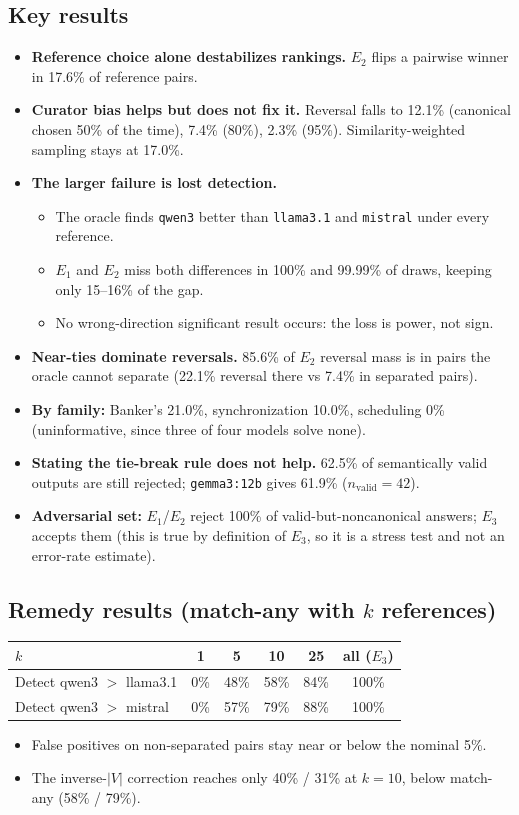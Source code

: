 \documentclass[11pt,a4paper]{article}
\newcommand{\E}[1]{E_{#1}}
\begin{document}
\subsection{Key results}
\begin{itemize}
\item \textbf{Reference choice alone destabilizes rankings.} $\E2$ flips a pairwise winner in 17.6\% of reference pairs.
\item \textbf{Curator bias helps but does not fix it.} Reversal falls to 12.1\% (canonical chosen 50\% of the time), 7.4\% (80\%), 2.3\% (95\%). Similarity-weighted sampling stays at 17.0\%.
\item \textbf{The larger failure is lost detection.}
  \begin{itemize}
  \item The oracle finds \texttt{qwen3} better than \texttt{llama3.1} and \texttt{mistral} under every reference.
  \item $\E1$ and $\E2$ miss both differences in 100\% and 99.99\% of draws, keeping only 15--16\% of the gap.
  \item No wrong-direction significant result occurs: the loss is power, not sign.
  \end{itemize}
\item \textbf{Near-ties dominate reversals.} 85.6\% of $\E2$ reversal mass is in pairs the oracle cannot separate (22.1\% reversal there vs 7.4\% in separated pairs).
\item \textbf{By family:} Banker's 21.0\%, synchronization 10.0\%, scheduling 0\% (uninformative, since three of four models solve none).
\item \textbf{Stating the tie-break rule does not help.} 62.5\% of semantically valid outputs are still rejected; \texttt{gemma3:12b} gives 61.9\% ($n_{\text{valid}}=42$).
\item \textbf{Adversarial set:} $\E1$/$\E2$ reject 100\% of valid-but-noncanonical answers; $\E3$ accepts them (this is true by definition of $\E3$, so it is a stress test and not an error-rate estimate).
\end{itemize}

\subsection{Remedy results (match-any with $k$ references)}
\begin{center}\small
\begin{tabular}{@{}lccccc@{}}
\toprule
$k$ & 1 & 5 & 10 & 25 & all ($\E3$)\\
\midrule
Detect qwen3 $>$ llama3.1 & 0\% & 48\% & 58\% & 84\% & 100\%\\
Detect qwen3 $>$ mistral  & 0\% & 57\% & 79\% & 88\% & 100\%\\
\bottomrule
\end{tabular}
\end{center}
\begin{itemize}
\item False positives on non-separated pairs stay near or below the nominal 5\%.
\item The inverse-$|V|$ correction reaches only 40\% / 31\% at $k=10$, below match-any (58\% / 79\%).
\end{itemize}
\end{document}
